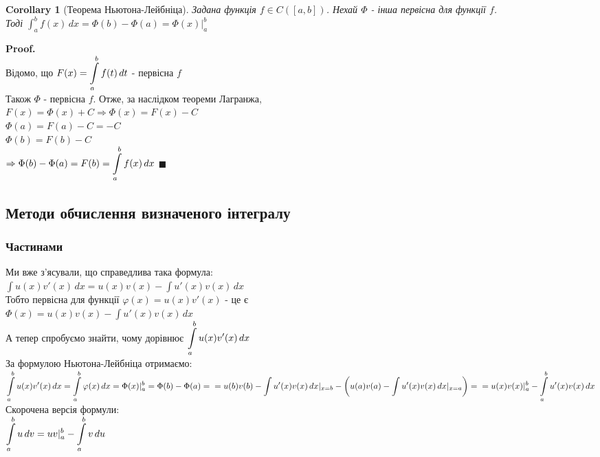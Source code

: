 \documentclass[a4paper, 14pt]{extarticle}
\def\huge{\displaystyle}
\def\bigline{\vspace{5mm}\\}
\theoremstyle{theoremdd}
\theoremstyle{theoremdd}
\theoremstyle{theoremdd}
\theoremstyle{theoremdd}
\theoremstyle{theoremdd}
\theoremstyle{theoremdd}
\theoremstyle{theoremdd}
\theoremstyle{theoremdd}
\newtheorem{corollary}[theorem]{Corollary}
\newenvironment{pf}{\vspace*{-3mm} \textbf{Proof. \\}}{$\blacksquare$}
\begin{document}
\begin{corollary}[Теорема Ньютона-Лейбніца]
Задана функція $f \in C([a,b])$. Нехай $\Phi$ - інша первісна для функції $f$. \\ Тоді
$\huge\int_a^b f(x)\,dx = \Phi(b) - \Phi(a) = \Phi(x)\Big|_a^b$
\end{corollary}

\begin{pf}
Відомо, що $F(x) = \huge\int\displaylimits_a^b f(t)\,dt$ - первісна $f$\\
Також $\Phi$ - первісна $f$. Отже, за наслідком теореми Лагранжа,\\
$F(x) = \Phi(x) + C \Rightarrow \Phi(x) = F(x) - C$\\
$\Phi(a) = F(a) - C = - C$\\
$\Phi(b) = F(b) - C$\\
$\Rightarrow \Phi(b) - \Phi(a) = F(b) = \huge\int\displaylimits_a^b f(x)\,dx$
\end{pf}
\bigline

\subsection{Методи обчислення визначеного інтегралу}
\subsubsection{Частинами}
Ми вже з'ясували, що справедлива така формула:\\
$\huge\int u(x)v'(x)\,dx = u(x)v(x) - \huge\int u'(x)v(x)\,dx$\\
Тобто первісна для функції $\varphi(x) = u(x)v'(x)$ - це є \\ $\Phi(x) = u(x)v(x) - \huge\int u'(x)v(x)\,dx$\\
А тепер спробуємо знайти, чому дорівнює $\huge\int\displaylimits_a^b u(x)v'(x)\,dx$\\
За формулою Ньютона-Лейбніца отримаємо:\\
$\huge\int\displaylimits_a^b u(x)v'(x)\,dx = \int\displaylimits_a^b \varphi(x)\,dx = \Phi(x) |_a^b = \Phi(b) - \Phi(a) = \\
= u(b)v(b) - \huge\int u'(x)v(x)\,dx |_{x = b} - \left(u(a)v(a) - \huge \int u'(x)v(x)\,dx |_{x = a} \right) = \\
= u(x)v(x) |_a^b - \huge\int\displaylimits_a^b u'(x)v(x)\,dx$
\bigline
Скорочена версія формули:\\
$\huge\int\displaylimits_a^b u\,dv = uv |_a^b - \huge\int\displaylimits_a^b v\,du$
\end{document}
